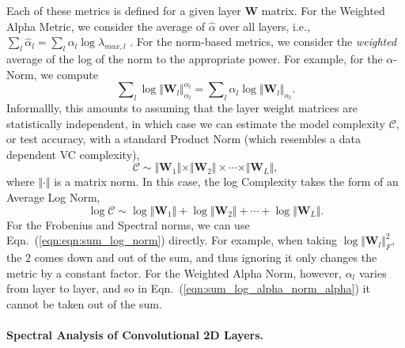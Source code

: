 Each of these metrics is defined for a given layer $\mathbf{W}$ matrix.
For the Weighted Alpha Metric, we consider the average of $\hat{\alpha}$ over all layers, i.e., $\sum_l \hat{\alpha}_l = \sum_l \alpha_l\log\lambda_{max,l} $ .  
For the norm-based metrics, we consider the \emph{weighted} average of the log of the norm to the appropriate power.
For example, for the $\alpha$-Norm, we compute 
\begin{equation}
\label{eqn:sum_log_alpha_norm_alpha}
\sum\nolimits_l \log \Vert\mathbf{W}_l\Vert_{\alpha_l}^{\alpha_l} 
=
\sum\nolimits_l \alpha_l \log \Vert\mathbf{W}_l\Vert_{\alpha_l} .
\end{equation}
Informallly, this amounts to assuming that the layer weight matrices are statistically independent, in which case we can estimate the model complexity $\mathcal{C}$, or test accuracy, with a standard Product Norm (which resembles a data dependent VC complexity),
\begin{equation}
\mathcal{C}\sim\Vert\mathbf{W}_{1}\Vert\times\Vert\mathbf{W}_{2}\Vert \times \cdots \times \Vert\mathbf{W}_{L}\Vert ,
\end{equation}
where $\Vert\cdot\Vert$ is a matrix norm.   
In this case, the log Complexity takes the form of an Average Log Norm,
\begin{equation}
\label{eqn:eqn:sum_log_norm}
\log\mathcal{C} \sim \log\Vert\mathbf{W}_{1}\Vert+\log\Vert\mathbf{W}_{2}\Vert + \cdots + \log\Vert\mathbf{W}_{L}\Vert  .
\end{equation}
For the Frobenius and Spectral norms, we can use Eqn.~(\ref{eqn:eqn:sum_log_norm}) directly. 
For example, when taking $\log\Vert\mathbf{W}_{l}\Vert_{F}^{2}$, the $2$ comes down and out of the sum, and thus ignoring it only changes the metric by a constant factor.
For the Weighted Alpha Norm, however, $\alpha_l$ varies from layer to layer, and so in Eqn.~(\ref{eqn:sum_log_alpha_norm_alpha}) it cannot be taken out of the sum.


\paragraph{Spectral Analysis of Convolutional 2D Layers.}


